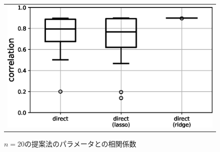 \begin{figure}[t]
\centering
    \begin{tabular}{c}
      \includegraphics[width=0.83\hsize]{img/plot4_mod.eps} \\
    \end{tabular}
  \caption{$n=20$の提案法のパラメータとの相関係数}
  \label{fig:result3}
\end{figure}